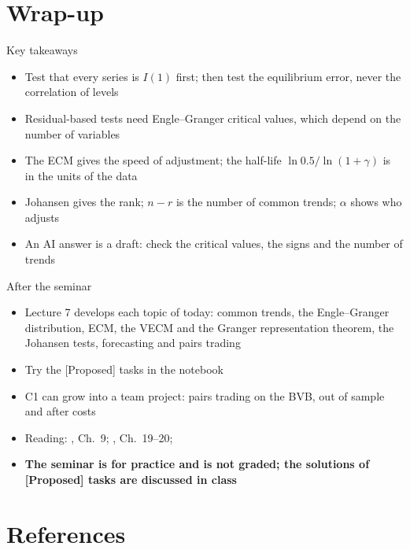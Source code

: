 \section{Wrap-up}

\begin{frame}{Key takeaways}
\itemsize{\small}
\begin{itemize}
    \item Test that every series is $I(1)$ first; then test the equilibrium error, never the correlation of levels
    \item Residual-based tests need Engle--Granger critical values, which depend on the number of variables
    \item The ECM gives the speed of adjustment; the half-life $\ln 0.5/\ln(1 + \gamma)$ is in the units of the data
    \item Johansen gives the rank; $n - r$ is the number of common trends; $\alpha$ shows who adjusts
    \item An AI answer is a draft: check the critical values, the signs and the number of trends
\end{itemize}
\end{frame}

\begin{frame}{After the seminar}
\itemsize{\small}
\begin{itemize}
    \item Lecture 7 develops each topic of today: common trends, the Engle--Granger distribution, ECM, the VECM and the Granger representation theorem, the Johansen tests, forecasting and pairs trading
    \item Try the [Proposed] tasks in the notebook
    \item C1 can grow into a team project: pairs trading on the BVB, out of sample and after costs
    \item Reading: , Ch.~9; , Ch.~19--20; 
    \item \textbf{The seminar is for practice and is not graded; the solutions of [Proposed] tasks are discussed in class}
\end{itemize}
\end{frame}


\section{References}

